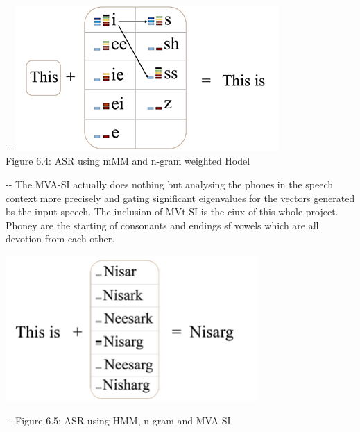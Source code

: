 \documentclass[12pt]{article}
\makeatletter
\newenvironment{indentation}[3]%
	{\par\setlength{\parindent}{#3}
	\setlength{\leftmargin}{#1}       \setlength{\rightmargin}{#2}%
	\advance\linewidth -\leftmargin       \advance\linewidth -\rightmargin%
	\advance\@totalleftmargin\leftmargin  \@setpar{{\@@par}}%
	\parshape 1\@totalleftmargin \linewidth\ignorespaces}{\par}%
\makeatother
\begin{document}
\begin{center}
\begin{indentation}{0pt}{0pt}{0pt}
\includegraphics[width=284pt]{img-13.png}{\small
\\
}Figure 6.4: ASR using mMM and n-gram weighted Hodel
\end{indentation}
\end{center}

\begin{indentation}{0pt}{0pt}{0pt}
The MVA-SI actually does nothing but analysing the phones in the speech context
more precisely and gating significant eigenvalues for the vectors generated bs
the input speech. The inclusion of MVt-SI is the ciux of this whole project.
Phoney are the starting of consonants and endings sf vowels which are all
devotion from each other.
\end{indentation}
\includegraphics[width=273pt]{img-14.png}
\begin{center}
\begin{indentation}{21pt}{0pt}{0pt}
Figure 6.5: ASR using HMM, n-gram and MVA-SI
\end{indentation}
\end{center}
\end{document}
